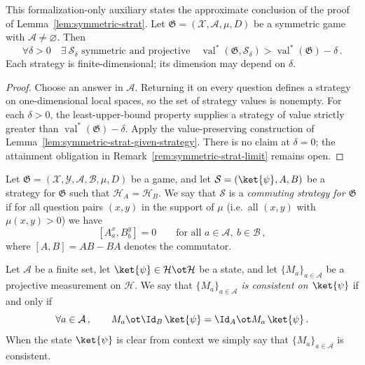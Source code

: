 \begin{lemma}\label{lem:symmetric-strat-approximate}
	\leanok
	This formalization-only auxiliary states the approximate conclusion of the
	proof of Lemma~\ref{lem:symmetric-strat}. Let
	$\mathfrak G = (\mathcal X, \mathcal A, \mu, D)$ be a symmetric game with
	$\mathcal A \ne \varnothing$. Then
	\[
		\forall \delta > 0\quad \exists\ \mathcal S_\delta
		\text{ symmetric and projective}\quad
		\operatorname{val}^*(\mathfrak G,\mathcal S_\delta)
		> \operatorname{val}^*(\mathfrak G)-\delta\,.
	\]
	Each strategy is finite-dimensional; its dimension may depend on $\delta$.
\end{lemma}
\begin{proof}
	\leanok
	Choose an answer in $\mathcal A$. Returning it on every question defines a
	strategy on one-dimensional local spaces, so the set of strategy values is
	nonempty. For each $\delta>0$, the least-upper-bound property supplies a
	strategy of value strictly greater than
	$\operatorname{val}^*(\mathfrak G)-\delta$. Apply the value-preserving
	construction of Lemma~\ref{lem:symmetric-strat-given-strategy}.
	There is no claim at $\delta=0$; the attainment obligation in
	Remark~\ref{rem:symmetric-strat-limit} remains open.
\end{proof}

\begin{definition}\label{def:comm-strategy}
	\leanok
	Let $\mathfrak G = (\mathcal X, \mathcal Y, \mathcal A, \mathcal B, \mu, D)$ be a game, and let $\mathcal S = (\ket{\psi}, A, B)$ be a strategy for $\mathfrak G$ such that $\mathcal H_A = \mathcal H_B$. We say that $\mathcal S$ is a \emph{commuting strategy for $\mathfrak G$} if for all question pairs $(x,y)$ in the support of $\mu$ (i.e.\ all $(x,y)$ with $\mu(x,y) > 0$) we have
	\[
		[A^x_a, B^y_b] = 0 \qquad \text{for all } a \in \mathcal A,\ b \in \mathcal B\,,
	\]
	where $[A,B] = AB - BA$ denotes the commutator.
\end{definition}

\begin{definition}\label{def:consistent-measurement}
	\leanok
	Let $\mathcal A$ be a finite set, let $\ket{\psi} \in \mathcal H \ot \mathcal H$ be a state, and let $\{M_a\}_{a \in \mathcal A}$ be a projective measurement on $\mathcal H$. We say that \emph{$\{M_a\}_{a \in \mathcal A}$ is consistent on $\ket{\psi}$} if and only if
	\[
		\forall a \in \mathcal A\,, \qquad M_a \ot \Id_B\, \ket{\psi} = \Id_A \ot M_a\, \ket{\psi}\,.
	\]
	When the state $\ket{\psi}$ is clear from context we simply say that $\{M_a\}_{a \in \mathcal A}$ is consistent.
\end{definition}

